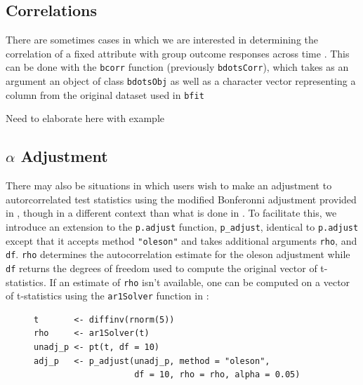 \subsection{Correlations}

There are sometimes cases in which we are interested in determining the correlation of a fixed attribute with group outcome responses across time . This can be done with the \texttt{bcorr} function (previously \texttt{bdotsCorr}), which takes as an argument an object of class \texttt{bdotsObj} as well as a character vector representing a column from the original dataset used in \texttt{bfit}

\begin{center}
\end{center}

Need to elaborate here with example

\subsection{$\alpha$ Adjustment}

There may also be situations in which users wish to make an adjustment to autorcorrelated test statistics using the modified Bonferonni adjustment provided in \cite{oleson2017detecting}, though in a different context than what is done in . To facilitate this, we introduce an extension to the \texttt{p.adjust} function, \texttt{p\_adjust}, identical to \texttt{p.adjust} except that it accepts method \texttt{"oleson"} and takes additional arguments \texttt{rho}, and \texttt{df}. \texttt{rho} determines the autocorrelation estimate for the oleson adjustment while \texttt{df} returns the degrees of freedom used to compute the original vector of t-statistics. If an estimate of \texttt{rho} isn't available, one can be computed on a vector of t-statistics using the \texttt{ar1Solver} function in :


\begin{singlespace}
\begin{figure}[H]
\centering
\begin{BVerbatim}
t       <- diffinv(rnorm(5))
rho     <- ar1Solver(t)
unadj_p <- pt(t, df = 10)
adj_p   <- p_adjust(unadj_p, method = "oleson", 
                    df = 10, rho = rho, alpha = 0.05)
\end{BVerbatim}
\end{figure}
\end{singlespace}

